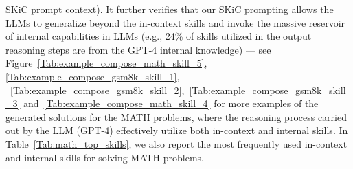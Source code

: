\documentclass{article} \usepackage{arxiv}
\begin{document}
SKiC prompt context). It further verifies that our SKiC prompting allows the LLMs to generalize beyond the in-context skills and invoke the massive reservoir of internal capabilities in LLMs (e.g., 24\% of skills utilized in the output reasoning steps are from the GPT-4 internal knowledge) --- see Figure~\ref{Tab:example_compose_math_skill_5}, \ref{Tab:example_compose_gsm8k_skill_1}, ~\ref{Tab:example_compose_gsm8k_skill_2},~\ref{Tab:example_compose_gsm8k_skill_3} and~\ref{Tab:example_compose_math_skill_4} for more examples of the generated solutions for the MATH problems, where the reasoning process carried out by the LLM (GPT-4) effectively utilize both in-context and internal skills. In Table~\ref{Tab:math_top_skills}, we also report the most frequently used in-context and internal skills for solving MATH problems.
\end{document}
